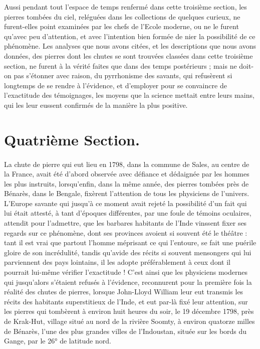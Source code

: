 \documentclass[a4paper, 12pt, oneside, french]{article}
\begin{document}
Aussi pendant tout l'espace de temps renfermé dans cette troisième section, les pierres tombées du ciel, reléguées dans les collections de quelques curieux, ne furent-elles point examinées par les chefs de l'Ecole moderne, ou ne le furent qu'avec peu d'attention, et avec l'intention bien formée de nier la possibilité de ce phénomène. Les analyses que nous avons citées, et les descriptions que nous avons données, des pierres dont les chutes se sont trouvées classées dans cette troisième section, ne furent à la vérité faites que dans des temps postérieurs ; mais ne doit-on pas s'étonner avec raison, du pyrrhonisme des savants, qui refusèrent si longtemps de se rendre à l'évidence, et d'employer pour se convaincre de l'exactitude des témoignages, les moyens que la science mettait entre leurs mains, qui les leur eussent confirmés de la manière la plus positive.
\clearpage
\section{Quatrième Section.}
\paragraph{}
La chute de pierre qui eut lieu en 1798, dans la commune de Sales, au centre de la France, avait été d'abord observée avec défiance et dédaignée par les hommes les plus instruits, lorsqu'enfin, dans la même année, des pierres tombées près de Bénarès, dans le Bengale, fixèrent l'attention de tous les physiciens de l'univers. L'Europe savante qui jusqu'à ce moment avait rejeté la possibilité d'un fait qui lui était attesté, à tant d'époques différentes, par une foule de témoins oculaires, attendit pour l'admettre, que les barbares habitants de l'Inde vinssent fixer ses regards sur ce phénomène, dont ses provinces avoient si souvent été le théâtre : tant il est vrai que partout l'homme méprisant ce qui l'entoure, se fait une puérile gloire de son incrédulité, tandis qu'avide des récits si souvent mensongers qui lui parviennent des pays lointains, il les adopte préférablement à ceux dont il pourrait lui-même vérifier l'exactitude ! C'est ainsi que les physiciens modernes qui jusqu'alors s'étaient refusés à l'évidence, reconnurent pour la première fois la réalité des chutes de pierres, lorsque John-Lloyd William leur eut transmis les récits des habitants superstitieux de l'Inde, et eut par-là fixé leur attention, sur les pierres qui tombèrent à environ huit heures du soir, le 19 décembre 1798, près de Krak-Hut, village situé au nord de la rivière Soomty, à environ quatorze milles de Bénarès, l'une des plus grandes villes de l'Indoustan, située sur les bords du Gange, par le 26° de latitude nord.
\end{document}
